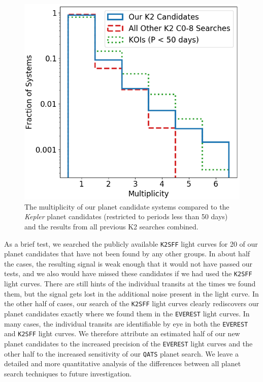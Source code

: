 \documentclass[twocolumn]{aastex62}
\newcommand{\project}[1]{\textsl{#1}}
\newcommand{\pipeline}[1]{\texttt{#1}}
\begin{document}
\begin{figure}[tbp]
\includegraphics[width=\columnwidth]{multiplicity_k2.png}
\caption{The multiplicity of our planet candidate systems compared to
  the \project{Kepler} planet candidates (restricted to periods less
  than 50 days) and the results from all previous K2 searches
  combined. \label{multiplicity}}
\end{figure}

As a brief test, we searched the publicly available \pipeline{K2SFF}
light curves for 20 of our planet candidates that have not been found
by any other groups. In about half the cases, the resulting signal is
weak enough that it would not have passed our tests, and we also would
have missed these candidates if we had used the \pipeline{K2SFF} light
curves. There are still hints of the individual transits at the times
we found them, but the signal gets lost in the additional noise
present in the light curve. In the other half of cases, our search of
the \pipeline{K2SFF} light curves clearly rediscovers our planet
candidates exactly where we found them in the \pipeline{EVEREST} light
curves. In many cases, the individual transits are identifiable by eye
in both the \pipeline{EVEREST} and \pipeline{K2SFF} light curves. We
therefore attribute an estimated half of our new planet candidates to
the increased precision of the \pipeline{EVEREST} light curves and the
other half to the increased sensitivity of our \pipeline{QATS} planet
search. We leave a detailed and more quantitative analysis of the
differences between all planet search techniques to future
investigation.
\end{document}
